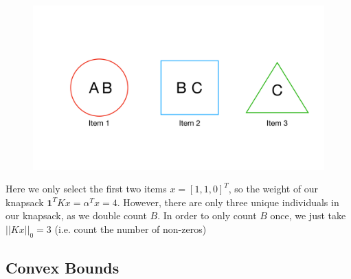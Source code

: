 \documentclass[12pt]{article}
\begin{document}
\begin{figure}[H]
    \centering
    \includegraphics[width = 14cm]{images/knap_intuition.pdf}
    \label{fig:items}
\end{figure}
Here we only select the first two items $x = [1,1,0]^T$, so the weight of our knapsack $\mathbf{1}^TKx = \alpha^Tx = 4$. However, there are only three unique individuals in our knapsack, as we double count $B$. In order to only count $B$ once, we just take $||Kx||_0 = 3$ (i.e. count the number of non-zeros)

\subsection{Convex Bounds}
\end{document}
